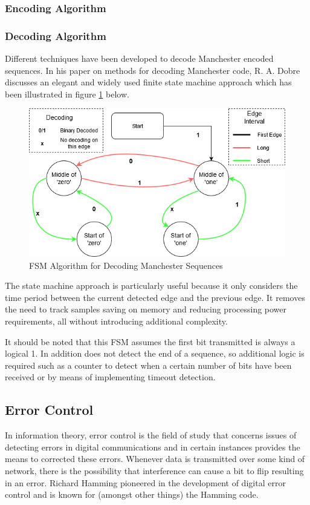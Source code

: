 \subsubsection{Encoding Algorithm}


\subsubsection{Decoding Algorithm}
Different techniques have been developed to decode Manchester encoded sequences. In his paper on methods for decoding Manchester code, R. A. Dobre discusses an elegant and widely used finite state machine approach which has been illustrated in figure \ref{fig:manchesterdecodingfsm} below. \cite{Dobre2014}

\begin{figure}[H]
	\centering
	\includegraphics[width=0.7\linewidth]{figures/litreview/manchester_decoding_fsm.png}
	\caption{FSM Algorithm for Decoding Manchester Sequences}
	\label{fig:manchesterdecodingfsm}
\end{figure}

The state machine approach is particularly useful because it only considers the time period between the current detected edge and the previous edge. It removes the need to track samples saving on memory and reducing processing power requirements, all without introducing additional complexity.

It should be noted that this FSM assumes the first bit transmitted is always a logical 1. In addition does not detect the end of a sequence, so additional logic is required such as a counter to detect when a certain number of bits have been received or by means of implementing timeout detection.

\subsection{Error Control}

In information theory, error control is the field of study that concerns issues of detecting errors in digital communications and in certain instances provides the means to corrected these errors. Whenever data is transmitted over some kind of network, there is the possibility that interference can cause a bit to flip resulting in an error. Richard Hamming pioneered in the development of digital error control and is known for (amongst other things) the Hamming code.


